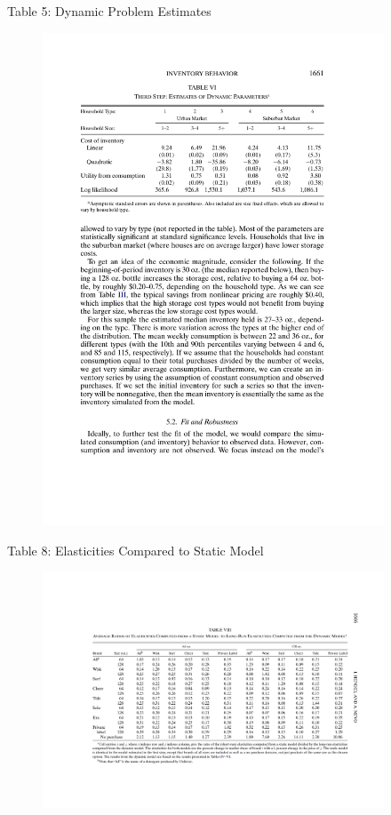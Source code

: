 \documentclass[xcolor=pdftex,dvipsnames,table,mathserif,aspectratio=169]{beamer}
\begin{document}
\begin{frame}{Table 5: Dynamic Problem Estimates}
\begin{figure}[htbp]
\begin{center}
\includegraphics[width=4in]{resources/hntable6.pdf}
\label{gandr1}
\end{center}
\end{figure}
\end{frame}

\begin{frame}{Table 8: Elasticities Compared to Static Model}
\begin{figure}[htbp]
\begin{center}
\includegraphics[width=4in]{resources/hntable8.pdf}
\label{gandr1}
\end{center}
\end{figure}
\end{frame}
\end{document}
